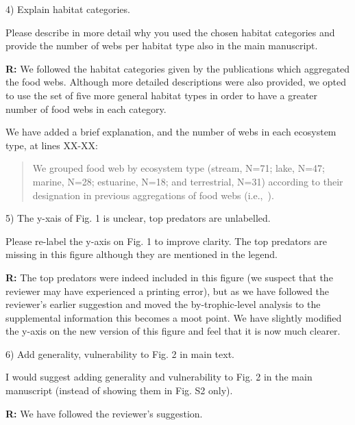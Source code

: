 \documentclass[12pt]{letter}
\newenvironment{refquote}{\bigskip \begin{it}}{\end{it}\smallskip}
\begin{document}
  4) Explain habitat categories.

  \begin{refquote}

    Please describe in more detail why you used the chosen habitat categories
    and provide the number of webs per habitat type also in the main
    manuscript.

  \end{refquote}


  \textbf{R:} We followed the habitat categories given by the publications which
  aggregated the food webs. Although more detailed descriptions were also provided, 
  we opted to use the set of five more general habitat types in order to have a 
  greater number of food webs in each category.


  We have added a brief explanation, and the number of webs in each ecosystem type, at lines XX-XX:

  \begin{quotation}
    We grouped food web by ecosystem type (stream, N=71; lake, N=47; marine, N=28; estuarine, N=18;
    and terrestrial, N=31) according to their designation in previous aggregations of food webs 
    (i.e.,~\citet{GlobalWeb,Riede2011,Dunne2013}).
    
  \end{quotation}


  5) The y-xais of Fig. 1 is unclear, top predators are unlabelled.


  \begin{refquote}

    Please re-label the y-axis on Fig. 1 to improve clarity. The top predators
    are missing in this figure although they are mentioned in the legend.

  \end{refquote}


  \textbf{R:} The top predators were indeed included in this figure (we suspect that the reviewer
  may have experienced a printing error), but as we have followed the reviewer's earlier
  suggestion and moved the by-trophic-level analysis to the supplemental information this becomes
  a moot point. We have slightly modified the y-axis on the new version of this figure and feel that
  it is now much clearer.


  6) Add generality, vulnerability to Fig. 2 in main text.


  \begin{refquote}

    I would suggest adding generality and vulnerability to Fig. 2 in the main
    manuscript (instead of showing them in Fig. S2 only).

  \end{refquote}


  \textbf{R:} We have followed the reviewer's suggestion.


  \newpage



\end{document}

